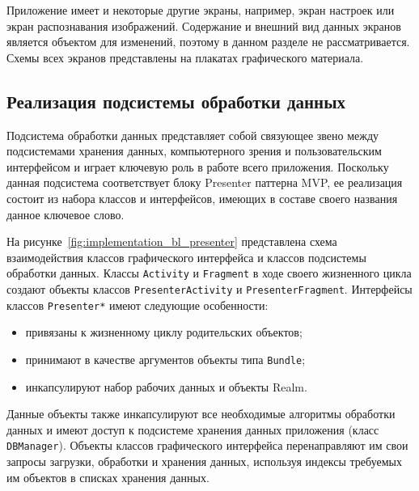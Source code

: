Приложение имеет и некоторые другие экраны, например,
экран настроек или экран распознавания изображений.
Содержание и внешний вид данных экранов является объектом для
изменений, поэтому в данном разделе не рассматривается.
Схемы всех экранов представлены на плакатах графического материала.


\subsection{Реализация подсистемы обработки данных}
\label{subsec:implementation_bl}

Подсистема обработки данных представляет собой связующее звено
между подсистемами хранения данных, компьютерного зрения и
пользовательским интерфейсом и играет ключевую роль в работе всего приложения.
Поскольку данная подсистема соответствует блоку Presenter паттерна
MVP, ее реализация состоит из набора классов и интерфейсов,
имеющих в составе своего названия данное ключевое слово.

На рисунке~\ref{fig:implementation_bl_presenter} представлена схема взаимодействия
классов графического интерфейса и классов подсистемы обработки данных.
Классы \texttt{Activity} и \texttt{Fragment} в ходе своего жизненного цикла
создают объекты классов \texttt{PresenterActivity} и \texttt{PresenterFragment}.
Интерфейсы классов \texttt{Presenter*} имеют следующие особенности:
\begin{itemize}
  \item привязаны к жизненному циклу родительских объектов;
  \item принимают в качестве аргументов объекты типа \texttt{Bundle};
  \item инкапсулируют набор рабочих данных и объекты Realm.
\end{itemize}

Данные объекты также инкапсулируют все необходимые алгоритмы обработки данных и
имеют доступ к подсистеме хранения данных приложения (класс \texttt{DBManager}).
Объекты классов графического интерфейса перенаправляют
им свои запросы загрузки, обработки и хранения данных,
используя индексы требуемых им объектов в списках хранения данных.

